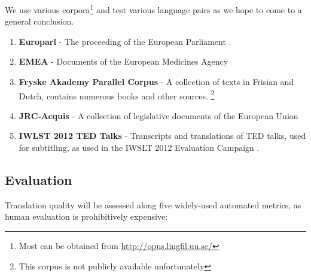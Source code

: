 \documentclass[11pt]{article}
\theoremstyle{break}
\begin{document}
We use various corpora\footnote{Most can be obtained from
\url{http://opus.lingfil.uu.se/}} and test various language pairs as we hope to come to a general conclusion.

\begin{enumerate}
  \item \textbf{Europarl} - The proceeding of the European Parliament
    \citep{EUROPARL,OPUS2012}.
  \item \textbf{EMEA} - Documents of the European Medicines Agency
    \citep{OPUS2012}
  \item \textbf{Fryske Akademy Parallel Corpus} - A collection of texts in
    Frisian and Dutch, contains numerous books and other sources. \citep{OERSETTER}
    \footnote{This corpus is not publicly available unfortunately} 
  \item \textbf{JRC-Acquis} - A collection of legislative documents of the
    European Union \citep{OPUS2012}
  \item \textbf{IWLST 2012 TED Talks} - Transcripts and translations of TED
    talks, used for subtitling, as used in the IWSLT 2012 Evaluation Campaign \citep{WIT3,IWSLT12}.
\end{enumerate}


\subsection{Evaluation}

Translation quality will be assessed along five widely-used automated metrics,
as human evaluation is prohibitively expensive:
\end{document}
